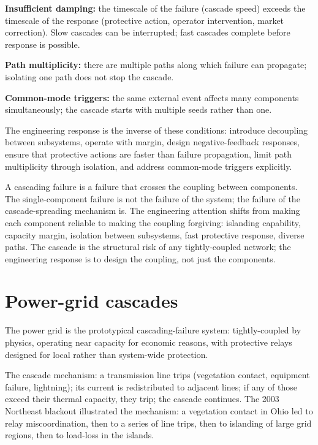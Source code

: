 \textbf{Insufficient damping:} the timescale of the failure (cascade speed) exceeds the timescale of the response (protective action, operator intervention, market correction). Slow cascades can be interrupted; fast cascades complete before response is possible.

\textbf{Path multiplicity:} there are multiple paths along which failure can propagate; isolating one path does not stop the cascade.

\textbf{Common-mode triggers:} the same external event affects many components simultaneously; the cascade starts with multiple seeds rather than one.

The engineering response is the inverse of these conditions: introduce decoupling between subsystems, operate with margin, design negative-feedback responses, ensure that protective actions are faster than failure propagation, limit path multiplicity through isolation, and address common-mode triggers explicitly.

\begin{archetype}
A cascading failure is a failure that crosses the coupling between components. The single-component failure is not the failure of the system; the failure of the cascade-spreading mechanism is. The engineering attention shifts from making each component reliable to making the coupling forgiving: islanding capability, capacity margin, isolation between subsystems, fast protective response, diverse paths. The cascade is the structural risk of any tightly-coupled network; the engineering response is to design the coupling, not just the components.
\end{archetype}

\section{Power-grid cascades}

The power grid is the prototypical cascading-failure system: tightly-coupled by physics, operating near capacity for economic reasons, with protective relays designed for local rather than system-wide protection.

The cascade mechanism: a transmission line trips (vegetation contact, equipment failure, lightning); its current is redistributed to adjacent lines; if any of those exceed their thermal capacity, they trip; the cascade continues. The 2003 Northeast blackout illustrated the mechanism: a vegetation contact in Ohio led to relay miscoordination, then to a series of line trips, then to islanding of large grid regions, then to load-loss in the islands.

